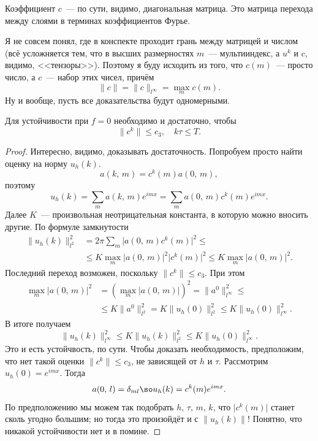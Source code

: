 \documentclass{trlnotes}
\begin{document}
	\begin{rem} 
		Коэффициент $c$~--- по сути, видимо, диагональная матрица. Это матрица перехода между слоями в терминах коэффициентов Фурье. 

		Я не совсем понял, где в конспекте проходит грань между матрицей и числом (всё усложняется тем, что в высших размерностях $m$~--- мультииндекс, а $u^k$ и $c$, видимо, <<тензоры>>). Поэтому я буду исходить из того, что $c(m)$~--- просто число, а $c$~--- набор этих чисел, причём
		\[  
			\|c\| = \|c\|_{l^{\infty}} = \max\limits_m c(m).
		\]
		Ну и вообще, пусть все доказательства будут одномерными.
	\end{rem}

	\begin{thm}
		Для устойчивости при $f = 0$ необходимо и достаточно, чтобы
		\[
			\|c^k\| \leqslant c_3, \quad k\tau \leqslant T.
		\]
		\begin{proof}
			Интересно, видимо, доказывать достаточность. Попробуем просто найти оценку на норму $u_h(k)$.
			\[
				a(k, \, m) = c^k(m)a(0, \, m),
			\]
			поэтому 
			\[
				u_h(k) = \sum\limits_m a(k, \, m) e^{imx} = \sum\limits_m a(0, \, m) c^k(m) e^{imx}.
			\]
			Далее $K$~--- произвольная неотрицательная константа, в которую можно вносить другие.
			По формуле замкнутости
			\begin{align*}
				\big\|u_h(k)\big\|_{l^2}^2 &= 2\pi \sum\limits_m \big|a(0, \, m) c^k(m)\big|^2 \leqslant \\ & \leqslant K \max\limits_{m} \big|a(0, \, m)\big|^2 \big|c^k(m)\big|^2 \leqslant  K \max\limits_m |a(0, \, m)\big|^2.
			\end{align*}
			Последний переход возможен, поскольку $\|c^k\| \leqslant c_3$.
			При этом
			\begin{align*}
				\max\limits_m |a(0, \, m)\big|^2 &= \left(\max\limits_m |a(0, \, m)\big|\right)^2 = \|a^0\|_{l^{\infty}}^2 \leqslant \\ &\leqslant K\|a^0\|_{l^2}^2 = K \big\|u_h(0)\big\|_{l^2}^2 \leqslant K\big\|u_h(0)\big\|_{l^{\infty}}^2.
			\end{align*}
			В итоге получаем
			\[
				\big\|u_h(k)\big\|_{l^{\infty}}^2 \leqslant K\big\|u_h(k)\big\|_{l^2}^2 \leqslant K\big\|u_h(0)\big\|_{l^{\infty}}^2.
			\]
			Это и есть устойчвость, по сути.
			Чтобы доказать необходимость, предположим, что нет такой оценки $\|c^k\| \leqslant c_3$, не зависящей от $h$ и $\tau$. Рассмотрим $u_h(0) = e^{imx}$. Тогда
			\[
				a(0, \, l) = \delta_{ml} \so u_h(k) = c^k(m)e^{imx}.
			\]
			По предположению мы можем так подобрать $h, \, \tau, \, m, \, k$, что $\big|c^k(m)\big|$ станет сколь угодно большим; но тогда это произойдёт и с $\|u_h(k)\|$! Понятно, что никакой устойчивости нет и в помине.
		\end{proof}
	\end{thm}
\end{document}
